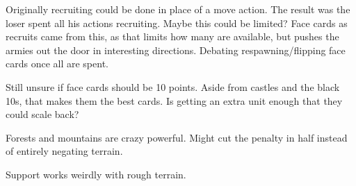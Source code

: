 \documentclass{article}
\begin{document}
Originally recruiting could be done in place of a move action.  The result was the loser spent all his actions recruiting.  Maybe this could be limited?  Face cards as recruits came from this, as that limits how many are available, but pushes the armies out the door in interesting directions.  Debating respawning/flipping face cards once all are spent.

Still unsure if face cards should be 10 points.  Aside from castles and the black 10s, that makes them the best cards.  Is getting an extra unit enough that they could scale back?

Forests and mountains are crazy powerful.  Might cut the penalty in half instead of entirely negating terrain.

Support works weirdly with rough terrain.  
\end{document}
